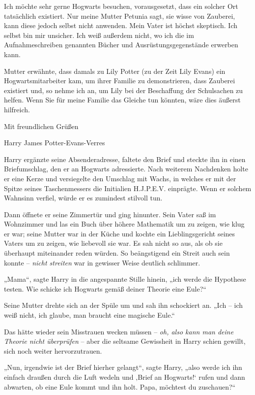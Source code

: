 {Ich möchte sehr gerne Hogwarts besuchen, vorausgesetzt, dass ein solcher Ort tatsächlich existiert. Nur meine Mutter Petunia sagt, sie wisse von Zauberei, kann diese jedoch selbst nicht anwenden. Mein Vater ist höchst skeptisch. Ich selbst bin mir unsicher. Ich weiß außerdem nicht, wo ich die im Aufnahmeschreiben genannten Bücher und Ausrüstungsgegenstände erwerben kann.

Mutter erwähnte, dass damals zu Lily Potter (zu der Zeit Lily Evans) ein Hogwartsmitarbeiter kam, um ihrer Familie zu demonstrieren, dass Zauberei existiert und, so nehme ich an, um Lily bei der Beschaffung der Schulsachen zu helfen. Wenn Sie für meine Familie das Gleiche tun könnten, wäre dies äußerst hilfreich.

Mit freundlichen Grüßen

Harry James Potter-Evans-Verres

Harry ergänzte seine Absenderadresse, faltete den Brief und steckte ihn in einen Briefumschlag, den er an Hogwarts adressierte. Nach weiterem Nachdenken holte er eine Kerze und versiegelte den Umschlag mit Wachs, in welches er mit der Spitze seines Taschenmessers die Initialien H.J.P.E.V. einprägte. Wenn er solchem Wahnsinn verfiel, würde er es zumindest stilvoll tun.

Dann öffnete er seine Zimmertür und ging hinunter. Sein Vater saß im Wohnzimmer und las ein Buch über höhere Mathematik um zu zeigen, wie klug er war; seine Mutter war in der Küche und kochte ein Lieblingsgericht seines Vaters um zu zeigen, wie liebevoll sie war. Es sah nicht so aus, als ob sie überhaupt miteinander reden würden. So beängstigend ein Streit auch sein konnte -- \emph{nicht streiten} war in gewisser Weise deutlich schlimmer.

„Mama“, sagte Harry in die angespannte Stille hinein, „ich werde die Hypothese testen. Wie schicke ich Hogwarts gemäß deiner Theorie eine Eule?“

Seine Mutter drehte sich an der Spüle um und sah ihn schockiert an. „Ich -- ich weiß nicht, ich glaube, man braucht eine magische Eule.“

Das hätte wieder sein Misstrauen wecken müssen -- \emph{oh, also kann man deine Theorie nicht überprüfen} -- aber die seltsame Gewissheit in Harry schien gewillt, sich noch weiter hervorzutrauen.

„Nun, irgendwie ist der Brief hierher gelangt“, sagte Harry, „also werde ich ihn einfach draußen durch die Luft wedeln und ‚Brief an Hogwarts!` rufen und dann abwarten, ob eine Eule kommt und ihn holt. Papa, möchtest du zuschauen?“

}
